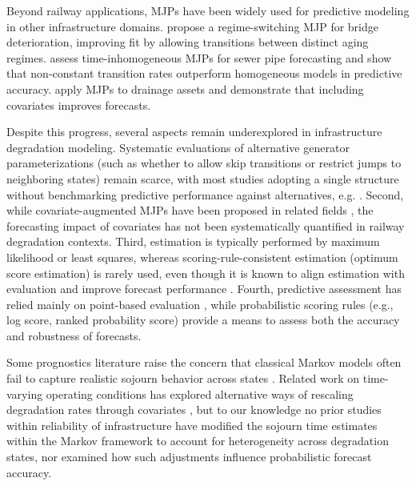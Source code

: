 Beyond railway applications, MJPs have been widely used for predictive modeling in other infrastructure domains. \citet{Mizutani2023RegimeSwitching} propose a regime-switching MJP for bridge deterioration, improving fit by allowing transitions between distinct aging regimes. \citet{JimenezRoa2024Nonhomogeneous} assess time-inhomogeneous MJPs for sewer pipe forecasting and show that non-constant transition rates outperform homogeneous models in predictive accuracy. \citet{Wu2021ConditionPrediction} apply MJPs to drainage assets and demonstrate that including covariates improves forecasts. %

Despite this progress, several aspects remain underexplored in infrastructure degradation modeling.
Systematic evaluations of alternative generator parameterizations (such as whether to allow skip transitions or restrict jumps to neighboring states) remain scarce, with most studies adopting a single structure without benchmarking predictive performance against alternatives, e.g. \citep{bisgaard2024A,Zbiciak2025}.
Second, while covariate-augmented MJPs have been proposed in related fields \citep{Wu2021ConditionPrediction}, the forecasting impact of covariates has not been systematically quantified in railway degradation contexts.
Third, estimation is typically performed by maximum likelihood or least squares, whereas scoring-rule-consistent estimation (optimum score estimation) is rarely used, even though it is known to align estimation with evaluation and improve forecast performance \citep{Gneiting2007,friedman1983a,Copas1983}.
Fourth, predictive assessment has relied mainly on point-based evaluation \citep{JimenezRoa2024Nonhomogeneous,Mizutani2023RegimeSwitching}, while probabilistic scoring rules (e.g., log score, ranked probability score) provide a means to assess both the accuracy and robustness of forecasts.

Some prognostics literature raise the concern that classical Markov models often fail to capture realistic sojourn behavior across states \citep{AIZPURUA2022}. Related work on time-varying operating conditions has explored alternative ways of rescaling degradation rates through covariates \citep{liu2024a,bisgaard2024A}, but to our knowledge no prior studies within reliability of infrastructure have modified the sojourn time estimates within the Markov framework to account for heterogeneity across degradation states, nor examined how such adjustments influence probabilistic forecast accuracy.



